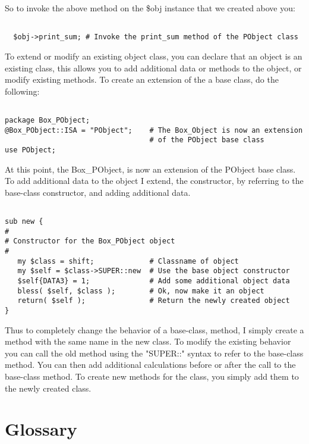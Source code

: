 \documentclass[]{article}
\begin{document}
So to invoke the above method on the \$obj instance that we created above you:
\begin{ttfamily}
\begin{verbatim}
   
  $obj->print_sum; # Invoke the print_sum method of the PObject class

\end{verbatim}
\end{ttfamily}
To extend or modify an existing object class, you can declare that an object is an existing
class, this allows you to add additional data or methods to the object, or modify existing
methods. To create an extension of the a base class, do the following:
\begin{ttfamily}
\begin{verbatim}

package Box_PObject;
@Box_PObject::ISA = "PObject";    # The Box_Object is now an extension 
                                  # of the PObject base class
use PObject;

\end{verbatim}
\end{ttfamily}
At this point, the Box\_PObject, is now an extension of the PObject base class. To add additional
data to the object I extend, the constructor, by referring to the base-class constructor, and
adding additional data.
\begin{ttfamily}
\begin{verbatim}

sub new {
#
# Constructor for the Box_PObject object
#
   my $class = shift;             # Classname of object
   my $self = $class->SUPER::new  # Use the base object constructor
   $self{DATA3} = 1;              # Add some additional object data
   bless( $self, $class );        # Ok, now make it an object
   return( $self );               # Return the newly created object
}

\end{verbatim}
\end{ttfamily}
Thus to completely change the behavior of a base-class, method, I simply create a method
with the same name in the new class. To modify the existing behavior you can call the old
method using the "SUPER::" syntax to refer to the base-class method. You can then add additional
calculations before or after the call to the base-class method. To create new methods for
the class, you simply add them to the newly created class.

\section{Glossary}
\end{document}
